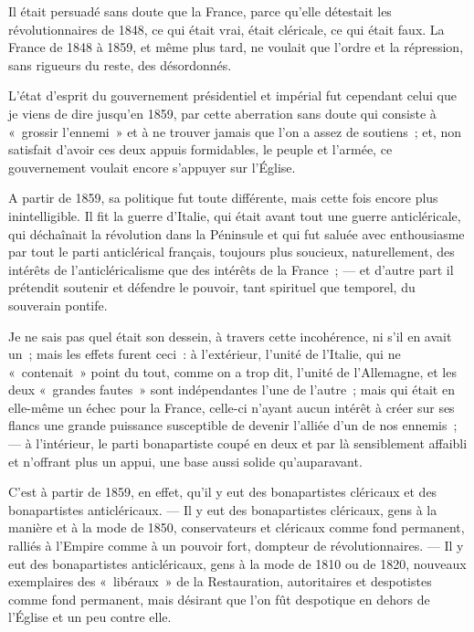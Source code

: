 \documentclass[french,twoside]{book} %
\begin{document}
Il était persuadé sans doute que la France, parce qu’elle détestait les révolutionnaires de 1848, ce qui était vrai, était cléricale, ce qui était faux. La  France de 1848 à 1859, et même plus tard, ne voulait que l’ordre et la répression, sans rigueurs du reste, des désordonnés.\par
L’état d’esprit du gouvernement présidentiel et impérial fut cependant celui que je viens de dire jusqu’en 1859, par cette aberration sans doute qui consiste à « grossir l’ennemi » et à ne trouver jamais que l’on a assez de soutiens ; et, non satisfait d’avoir ces deux appuis formidables, le peuple et l’armée, ce gouvernement voulait encore s’appuyer sur l’Église.\par
A partir de 1859, sa politique fut toute différente, mais cette fois encore plus inintelligible. Il fit la guerre d’Italie, qui était avant tout une guerre anticléricale, qui déchaînait la révolution dans la Péninsule et qui fut saluée avec enthousiasme par tout le parti anticlérical français, toujours plus soucieux, naturellement, des intérêts de l’anticléricalisme que des intérêts de la France ; — et d’autre part il prétendit soutenir et défendre le pouvoir, tant spirituel que temporel, du souverain pontife.\par
Je ne sais pas quel était son dessein, à travers cette incohérence, ni s’il en avait un ; mais les effets furent ceci : à l’extérieur, l’unité de l’Italie, qui ne « contenait » point du tout, comme on a trop dit, l’unité de l’Allemagne, et les deux « grandes  fautes » sont indépendantes l’une de l’autre ; mais qui était en elle-même un échec pour la France, celle-ci n’ayant aucun intérêt à créer sur ses flancs une grande puissance susceptible de devenir l’alliée d’un de nos ennemis ; — à l’intérieur, le parti bonapartiste coupé en deux et par là sensiblement affaibli et n’offrant plus un appui, une base aussi solide qu’auparavant.\par
C’est à partir de 1859, en effet, qu’il y eut des bonapartistes cléricaux et des bonapartistes anticléricaux. — Il y eut des bonapartistes cléricaux, gens à la manière et à la mode de 1850, conservateurs et cléricaux comme fond permanent, ralliés à l’Empire comme à un pouvoir fort, dompteur de révolutionnaires. — Il y eut des bonapartistes anticléricaux, gens à la mode de 1810 ou de 1820, nouveaux exemplaires des « libéraux » de la Restauration, autoritaires et despotistes comme fond permanent, mais désirant que l’on fût despotique en dehors de l’Église et un peu contre elle.\par
\end{document}
